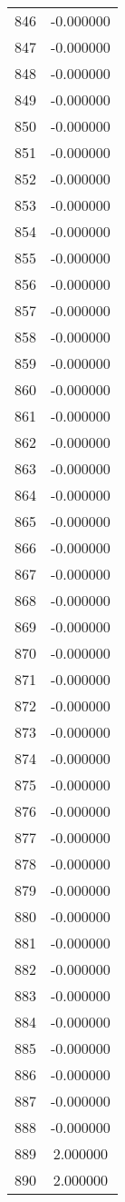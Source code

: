 \documentclass[12pt]{article}
\begin{document}
\begin{longtable}{@{}cc@{}}
846 & -0.000000 \\
847 & -0.000000 \\
848 & -0.000000 \\
849 & -0.000000 \\
850 & -0.000000 \\
851 & -0.000000 \\
852 & -0.000000 \\
853 & -0.000000 \\
854 & -0.000000 \\
855 & -0.000000 \\
856 & -0.000000 \\
857 & -0.000000 \\
858 & -0.000000 \\
859 & -0.000000 \\
860 & -0.000000 \\
861 & -0.000000 \\
862 & -0.000000 \\
863 & -0.000000 \\
864 & -0.000000 \\
865 & -0.000000 \\
866 & -0.000000 \\
867 & -0.000000 \\
868 & -0.000000 \\
869 & -0.000000 \\
870 & -0.000000 \\
871 & -0.000000 \\
872 & -0.000000 \\
873 & -0.000000 \\
874 & -0.000000 \\
875 & -0.000000 \\
876 & -0.000000 \\
877 & -0.000000 \\
878 & -0.000000 \\
879 & -0.000000 \\
880 & -0.000000 \\
881 & -0.000000 \\
882 & -0.000000 \\
883 & -0.000000 \\
884 & -0.000000 \\
885 & -0.000000 \\
886 & -0.000000 \\
887 & -0.000000 \\
888 & -0.000000 \\
889 & 2.000000 \\
890 & 2.000000 \\

\end{longtable}
\end{document}
